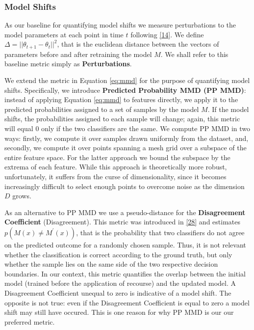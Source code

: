 \documentclass[conference,final,]{IEEEtran}
\theoremstyle{definition}
\theoremstyle{definition}
\theoremstyle{definition}
\theoremstyle{definition}
\theoremstyle{remark}
\begin{document}
\hypertarget{model-shifts}{%
\subsubsection{Model Shifts}\label{model-shifts}}

As our baseline for quantifying model shifts we measure perturbations to the model parameters at each point in time \(t\) following \protect\hyperlink{ref-upadhyay2021towards}{{[}14{]}}. We define \(\Delta=||\theta_{t+1}-\theta_{t}||^2\), that is the euclidean distance between the vectors of parameters before and after retraining the model \(M\). We shall refer to this baseline metric simply as \textbf{Perturbations}.

We extend the metric in Equation \eqref{eq:mmd} for the purpose of quantifying model shifts. Specifically, we introduce \textbf{Predicted Probability MMD (PP MMD)}: instead of applying Equation \eqref{eq:mmd} to features directly, we apply it to the predicted probabilities assigned to a set of samples by the model \(M\). If the model shifts, the probabilities assigned to each sample will change; again, this metric will equal 0 only if the two classifiers are the same. We compute PP MMD in two ways: firstly, we compute it over samples drawn uniformly from the dataset, and, secondly, we compute it over points spanning a mesh grid over a subspace of the entire feature space. For the latter approach we bound the subspace by the extrema of each feature. While this approach is theoretically more robust, unfortunately, it suffers from the curse of dimensionality, since it becomes increasingly difficult to select enough points to overcome noise as the dimension \(D\) grows.

As an alternative to PP MMD we use a pseudo-distance for the \textbf{Disagreement Coefficient} (Disagreement). This metric was introduced in \protect\hyperlink{ref-hanneke2007bound}{{[}28{]}} and estimates \(p(M(x) \neq M^\prime(x))\), that is the probability that two classifiers do not agree on the predicted outcome for a randomly chosen sample. Thus, it is not relevant whether the classification is correct according to the ground truth, but only whether the sample lies on the same side of the two respective decision boundaries. In our context, this metric quantifies the overlap between the initial model (trained before the application of recourse) and the updated model. A Disagreement Coefficient unequal to zero is indicative of a model shift. The opposite is not true: even if the Disagreement Coefficient is equal to zero a model shift may still have occured. This is one reason for why PP MMD is our our preferred metric.
\end{document}
